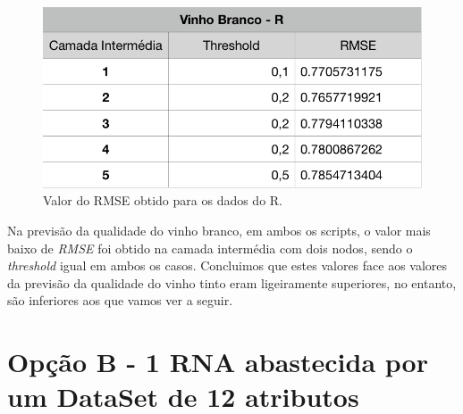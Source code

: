 \documentclass{report}
\begin{document}
\begin{figure}[H]
\centering
\includegraphics[scale=0.5]{tabelas/4} 
\caption{Valor do RMSE obtido para os dados do R.}
\end{figure} 




Na previsão da qualidade do vinho branco, em ambos os scripts, o valor mais baixo de \textit{RMSE} foi obtido na camada intermédia com dois nodos, sendo o \textit{threshold} igual em ambos os casos. Concluimos que estes valores face aos valores da previsão da qualidade do vinho tinto eram ligeiramente superiores, no entanto, são inferiores aos que vamos ver a seguir.








































\section{Opção B - 1 RNA abastecida por um DataSet de 12 atributos}
\end{document}
